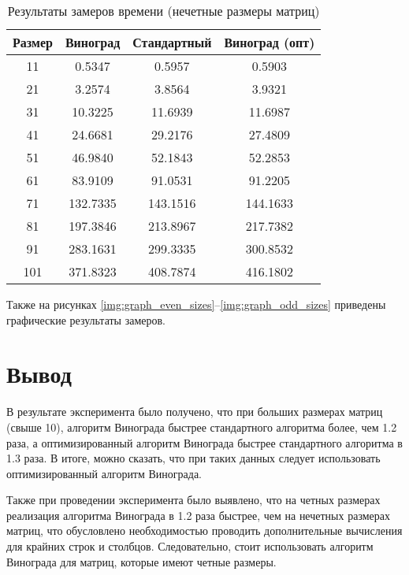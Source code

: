 \begin{table}[h]
    \begin{center}
        \begin{threeparttable}
        \captionsetup{justification=raggedright,singlelinecheck=off}
        \caption{Результаты замеров времени (нечетные размеры матриц)}
        \label{tbl:time_mes_odd}
        \begin{tabular}{|c|c|c|c|}
            \hline
            Размер & Виноград & Стандартный & Виноград (опт) \\
            \hline
            11 & 0.5347 & 0.5957 & 0.5903 \\
            \hline
            21 & 3.2574 & 3.8564 & 3.9321 \\
            \hline
            31 & 10.3225 & 11.6939 & 11.6987 \\
            \hline
            41 & 24.6681 & 29.2176 & 27.4809 \\
            \hline
            51 & 46.9840 & 52.1843 & 52.2853 \\
            \hline
            61 & 83.9109 & 91.0531 & 91.2205 \\
            \hline
            71 & 132.7335 & 143.1516 & 144.1633 \\
            \hline
            81 & 197.3846 & 213.8967 & 217.7382 \\
            \hline
            91 & 283.1631 & 299.3335 & 300.8532 \\
            \hline
            101 & 371.8323 & 408.7874 & 416.1802 \\
            \hline
		\end{tabular}
    \end{threeparttable}
\end{center}
\end{table}

Также на рисунках \ref{img:graph_even_sizes}--\ref{img:graph_odd_sizes} приведены графические результаты замеров.

\clearpage


\section{Вывод}

В результате эксперимента было получено, что при больших размерах матриц (свыше 10), алгоритм Винограда быстрее стандартного алгоритма более, чем 1.2 раза, а оптимизированный алгоритм Винограда быстрее стандартного алгоритма в 1.3 раза. В итоге, можно сказать, что при таких данных следует использовать оптимизированный алгоритм Винограда.

Также при проведении эксперимента было выявлено, что на четных размерах реализация алгоритма Винограда в 1.2 раза быстрее, чем на нечетных размерах матриц, что обусловлено необходимостью проводить дополнительные вычисления для крайних строк и столбцов.  Следовательно, стоит использовать алгоритм Винограда для матриц, которые имеют четные размеры.
